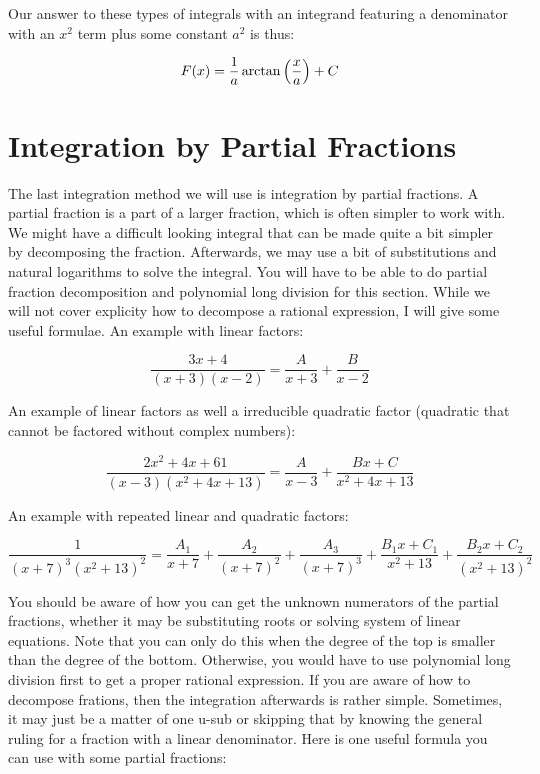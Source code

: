 \documentclass[12pt]{article}
\begin{document}
Our answer to these types of integrals with an integrand featuring a denominator with an $x^2$ term plus some constant $a^2$ is thus:

$$
    F(x) = \frac{1}{a}\arctan\left(\frac{x}{a}\right) + C \\
$$

\section{Integration by Partial Fractions}

The last integration method we will use is integration by partial fractions.
A partial fraction is a part of a larger fraction, which is often simpler to work with.
We might have a difficult looking integral that can be made quite a bit simpler by decomposing the fraction.
Afterwards, we may use a bit of substitutions and natural logarithms to solve the integral.
You will have to be able to do partial fraction decomposition and polynomial long division for this section.
While we will not cover explicity how to decompose a rational expression, I will give some useful formulae.
An example with linear factors:

$$
    \frac{3x+4}{(x+3)(x-2)} = \frac{A}{x+3} + \frac{B}{x-2}
$$

An example of linear factors as well a irreducible quadratic factor (quadratic that cannot be factored without complex numbers):

$$
    \frac{2x^2+4x+61}{(x-3)(x^2+4x+13)} = \frac{A}{x-3} + \frac{Bx+C}{x^2+4x+13}
$$

An example with repeated linear and quadratic factors:

$$
    \frac{1}{(x+7)^3(x^2+13)^2} = \frac{A_1}{x+7} + \frac{A_2}{(x+7)^2} + \frac{A_3}{(x+7)^3} + \frac{B_1x+C_1}{x^2+13} + \frac{B_2x+C_2}{(x^2+13)^2}
$$

You should be aware of how you can get the unknown numerators of the partial fractions, whether it may be substituting roots or solving system of linear equations.
Note that you can only do this when the degree of the top is smaller than the degree of the bottom.
Otherwise, you would have to use polynomial long division first to get a proper rational expression.
If you are aware of how to decompose frations, then the integration afterwards is rather simple.
Sometimes, it may just be a matter of one u-sub or skipping that by knowing the general ruling for a fraction with a linear denominator.
Here is one useful formula you can use with some partial fractions:
\end{document}
